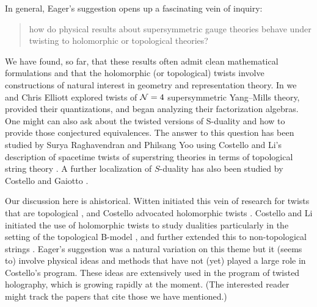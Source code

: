 \documentclass[11pt]{amsart}
\begin{document}
In general, Eager's suggestion opens up a fascinating vein of inquiry:
\begin{quote}
how do physical results about supersymmetric gauge theories behave under twisting to holomorphic or topological theories?
\end{quote}
We have found, so far, that these results often admit clean mathematical formulations and that the holomorphic (or topological) twists involve constructions of natural interest in geometry and representation theory.
In \cite{EGW} we and Chris Elliott explored twists of $\mathcal N=4$ supersymmetric Yang--Mills theory,
provided their quantizations, and began analyzing their factorization algebras.
One might can also ask about the twisted versions of S-duality and how to provide those conjectured equivalences.
The answer to this question has been studied by Surya Raghavendran and Philsang Yoo \cite{RYsduality} using Costello and Li's description of spacetime twists of superstring theories in terms of topological string theory \cite{CLsugra,CLtypeI}. 
A further localization of $S$-duality has also been studied by Costello and Gaiotto \cite{CGholography}.

\begin{rmk}
Our discussion here is ahistorical.
Witten initiated this vein of research for twists that are topological \cite{WittenTwist},
and Costello advocated holomorphic twists \cite{CostelloHol}.  
Costello and Li initiated the use of holomorphic twists to study dualities particularly in the setting of the topological B-model \cite{CLbcov1,CLbcov2,CLbcov3}, and further extended this to non-topological strings \cite{CLsugra}. 
Eager's suggestion was a natural variation on this theme but it (seems to) involve physical ideas and methods that have not (yet) played a large role in Costello's program.
These ideas are extensively used in the program of twisted holography, which is growing rapidly at the moment.
(The interested reader might track the papers that cite those we have mentioned.)
\end{rmk}

\printbibliography
\end{document}
